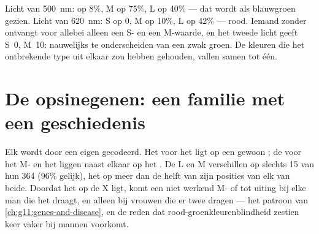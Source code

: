 \begin{example}\label{ex:g11:the-eye:curves}
Licht van \qty{500}{nm}:  op 8\%, M op 75\%, L op 40\% --- dat
wordt als blauwgroen gezien. Licht van \qty{620}{nm}: S op 0, M op 10\%,
L op 42\% --- rood. Iemand zonder  ontvangt voor allebei alleen
een S- en een M-waarde, en het tweede licht geeft S~0, M~10: nauwelijks te
onderscheiden van een zwak groen. De kleuren die het ontbrekende type uit
elkaar zou hebben gehouden, vallen samen tot één.
\end{example}

\section{De opsinegenen: een familie met een geschiedenis}

\begin{proposition}\label{prop:g11:the-eye:genes}
Elk  wordt door een eigen  gecodeerd. Het  voor het 
ligt op een gewoon ; de  voor het M- en het  liggen
naast elkaar op het . De  L en M verschillen op
slechts 15 van hun 364  (96\% gelijk), het  op meer dan
de helft van zijn posities van elk van beide. Doordat het op de X ligt,
komt een niet werkend M- of  tot uiting bij elke man die het
draagt, en alleen bij vrouwen die er twee dragen --- het patroon van
\cref{ch:g11:genes-and-disease}, en de reden dat
rood-groenkleurenblindheid zestien keer vaker bij mannen voorkomt.
\end{proposition}
\admitted

